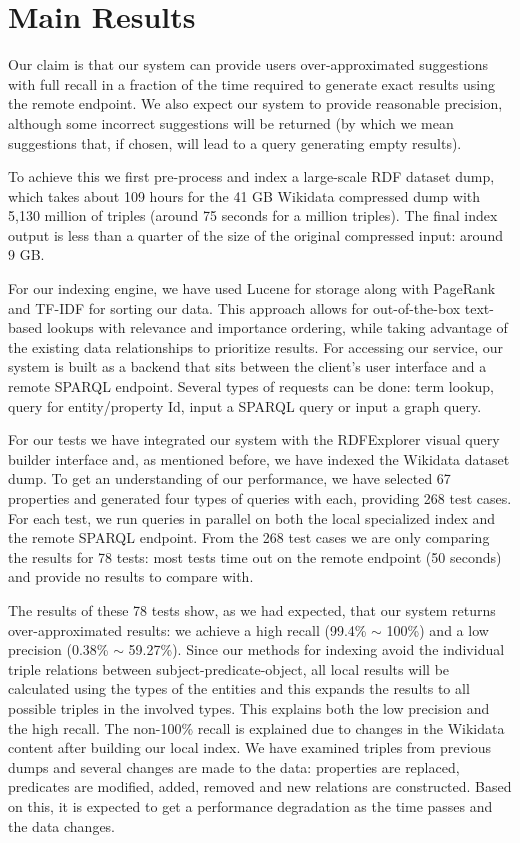 \section{Main Results}

Our claim is that our system can provide users over-approximated suggestions with full recall in a fraction of the time required to
generate exact results using the remote endpoint. We also expect our system to provide reasonable precision, although some incorrect suggestions will be returned (by which we mean suggestions that, if chosen, will lead to a query generating empty results).

To achieve this we first pre-process and index a large-scale RDF dataset dump, which takes about 109 hours for the 41 GB Wikidata compressed dump with 5,130 million of triples (around 75 seconds for a million triples). The final index output is less than a quarter of the size of the original compressed input: around 9 GB. 

For our indexing engine, we have used Lucene for storage along with PageRank and TF-IDF for sorting our data. This approach allows for out-of-the-box text-based lookups with relevance and importance ordering, while taking advantage of the existing data relationships to prioritize results. For accessing our service, our system is built as a backend that sits between the client's user interface and a remote SPARQL endpoint. Several types of requests can be done: term lookup, query for entity/property Id, input a SPARQL query or input a graph query.

For our tests we have integrated our system with the RDFExplorer visual query builder interface and, as mentioned before, we have indexed the Wikidata dataset dump. To get an understanding of our performance, we have selected 67 properties and generated four types of queries with each, providing 268 test cases. For each test, we run queries in parallel on both the local specialized index and the remote SPARQL endpoint. From the 268 test cases we are only comparing the results for 78 tests: most tests time out on the remote endpoint (50 seconds) and provide no results to compare with. 

The results of these 78 tests show, as we had expected, that our system returns over-approximated results: we achieve a high recall (99.4\% $\sim$ 100\%) and a low precision (0.38\% $\sim$ 59.27\%). Since our methods for indexing avoid the individual triple relations between subject-predicate-object, all local results will be calculated using the types of the entities and this expands the results to all possible triples in the involved types. This explains both the low precision and the high recall. The non-100\% recall is explained due to changes in the Wikidata content after building our local index. We have examined triples from previous dumps and several changes are made to the data: properties are replaced, predicates are modified, added, removed and new relations are constructed. Based on this, it is expected to get a performance degradation as the time passes and the data changes.


